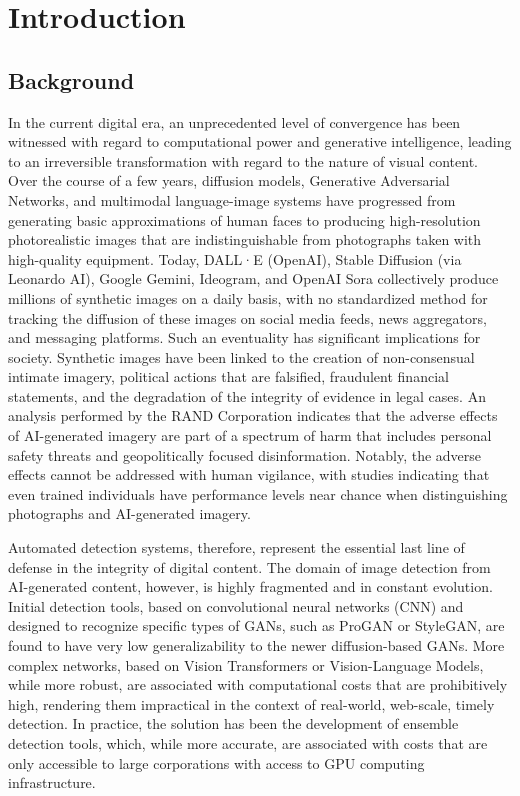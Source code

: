 \chapter{Introduction}

\section{Background}

In the current digital era, an unprecedented level of convergence has been witnessed with regard to computational power and generative intelligence, leading to an irreversible transformation with regard to the nature of visual content. Over the course of a few years, diffusion models, Generative Adversarial Networks, and multimodal language-image systems have progressed from generating basic approximations of human faces to producing high-resolution photorealistic images that are indistinguishable from photographs taken with high-quality equipment. Today, DALL·E (OpenAI), Stable Diffusion (via Leonardo AI), Google Gemini, Ideogram, and OpenAI Sora collectively produce millions of synthetic images on a daily basis, with no standardized method for tracking the diffusion of these images on social media feeds, news aggregators, and messaging platforms. Such an eventuality has significant implications for society. Synthetic images have been linked to the creation of non-consensual intimate imagery, political actions that are falsified, fraudulent financial statements, and the degradation of the integrity of evidence in legal cases. An analysis performed by the RAND Corporation \cite{chandra2024rand} indicates that the adverse effects of AI-generated imagery are part of a spectrum of harm that includes personal safety threats and geopolitically focused disinformation. Notably, the adverse effects cannot be addressed with human vigilance, with studies indicating that even trained individuals have performance levels near chance when distinguishing photographs and AI-generated imagery.

Automated detection systems, therefore, represent the essential last line of defense in the integrity of digital content. The domain of image detection from AI-generated content, however, is highly fragmented and in constant evolution. Initial detection tools, based on convolutional neural networks (CNN) and designed to recognize specific types of GANs, such as ProGAN or StyleGAN, are found to have very low generalizability to the newer diffusion-based GANs. More complex networks, based on Vision Transformers or Vision-Language Models, while more robust, are associated with computational costs that are prohibitively high, rendering them impractical in the context of real-world, web-scale, timely detection. In practice, the solution has been the development of ensemble detection tools, which, while more accurate, are associated with costs that are only accessible to large corporations with access to GPU computing infrastructure.

